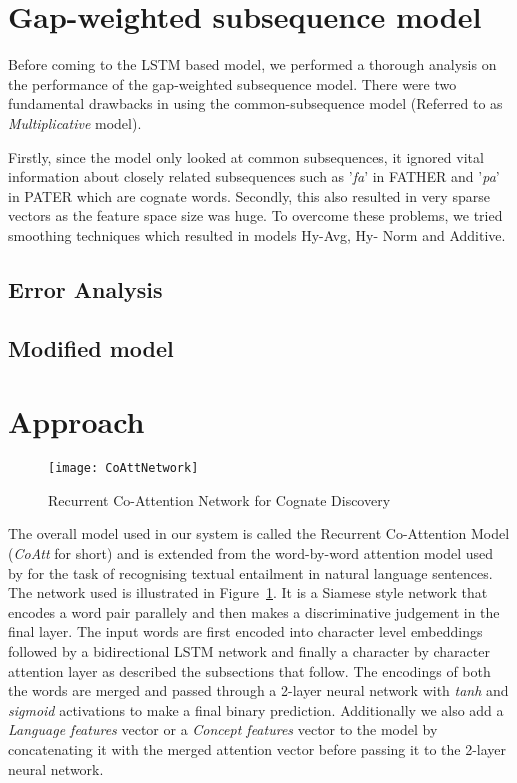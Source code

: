 \documentclass[11pt,letterpaper]{article}
\begin{document}
\section{Gap-weighted subsequence model}
Before coming to the LSTM based model, we performed a thorough analysis on the performance of the gap-weighted subsequence model.
There were two fundamental drawbacks in using the common-subsequence model (Referred to as \textit{Multiplicative} model). 

Firstly, since the model only looked at common subsequences, it ignored vital information about closely related subsequences such as ’\textit{fa}’ in FATHER and ’\textit{pa}’ in PATER which are cognate words. 
Secondly, this also resulted in very sparse vectors as the feature space size was huge. To overcome these problems, we tried smoothing techniques which resulted in models Hy-Avg, Hy- Norm and Additive.

\subsection{Error Analysis}
\subsection{Modified model}

\section{Approach}

\begin{figure}[t]
	\centering
	\texttt{[image: CoAttNetwork]}
    \caption{Recurrent Co-Attention Network for Cognate Discovery}
    \label{CoAttNet}
\end{figure}

The overall model used in our system is called the Recurrent Co-Attention Model (\textit{CoAtt} for short) and is extended from the word-by-word attention model used by \citet{rocktaschel2016reasoning} for the task of recognising textual entailment in natural language sentences. The network used is illustrated in Figure~\ref{CoAttNet}. It is a Siamese style network that encodes a word pair parallely and then makes a discriminative judgement in the final layer. The input words are first encoded into character level embeddings followed by a bidirectional LSTM network and finally a character by character attention layer as described the subsections that follow. The encodings of both the words are merged and passed through a 2-layer neural network with \textit{tanh} and \textit{sigmoid} activations to make a final binary prediction. Additionally we also add a \textit{Language features} vector or a \textit{Concept features} vector to the model by concatenating it with the merged attention vector before passing it to the 2-layer neural network.
\end{document}
